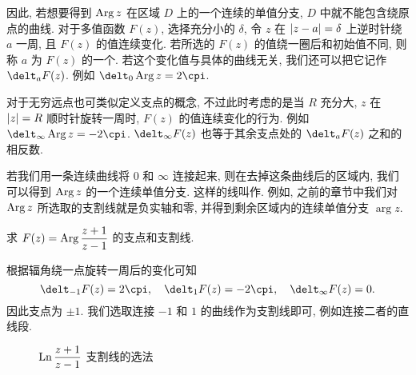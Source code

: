 因此, 若想要得到 $\operatorname{Arg} z$ 在区域 $D$ 上的一个连续的单值分支, $D$ 中就不能包含绕原点的曲线.
对于多值函数 $F(z)$, 选择充分小的 $\delta$, 令 $z$ 在 $\left|z-a\right|=\delta$ 上逆时针绕 $a$ 一周, 且 $F(z)$ 的值连续变化.
若所选的 $F(z)$ 的值绕一圈后和初始值不同, 则称 $a$ 为 $F(z)$ 的一个.
若这个变化值与具体的曲线无关, 我们还可以把它记作 $\delt_a F(z)$.
例如 $\delt_0 \Arg z=2\cpi$.

对于无穷远点也可类似定义支点的概念, 不过此时考虑的是当 $R$ 充分大, $z$ 在 $\left|z\right|=R$ 顺时针旋转一周时, $F(z)$ 的值连续变化的行为.
例如 $\delt_\infty \Arg z=-2\cpi$.
$\delt_\infty F(z)$ 也等于其余支点处的 $\delt_a F(z)$ 之和的相反数.

若我们用一条连续曲线将 $0$ 和 $\infty$ 连接起来, 则在去掉这条曲线后的区域内, 我们可以得到 $\operatorname{Arg} z$ 的一个连续单值分支.
这样的线叫作.
例如, 之前的章节中我们对 $\operatorname{Arg} z$ 所选取的支割线就是负实轴和零, 并得到剩余区域内的连续单值分支 $\arg z$.

\begin{example}
  \label{exam:cut-arg-frac}
  求 $F(z)=\operatorname{Arg} \dfrac{z+1}{z-1}$ 的支点和支割线.
\end{example}

\begin{solution}
  根据辐角绕一点旋转一周后的变化可知
  \[
    \delt_{-1} F(z)=2\cpi,\quad
    \delt_1 F(z)=-2\cpi,\quad
    \delt_\infty F(z)=0.
  \]
  因此支点为 $\pm1$.
  我们选取连接 $-1$ 和 $1$ 的曲线作为支割线即可, 例如连接二者的直线段.
\end{solution}

\begin{figure}[H]
  \centering
  \caption{$\operatorname{Ln}\dfrac{z+1}{z-1}$ 支割线的选法}
\end{figure}

